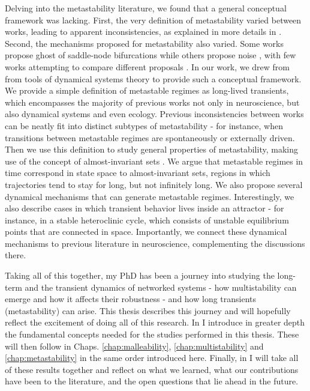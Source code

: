 Delving into the metastability literature, we found that a general conceptual framework was lacking. First, the very definition of metastability varied between works, leading to apparent inconsistencies, as explained in more details in . Second, the mechanisms proposed for metastability also varied. Some works propose ghost of saddle-node bifurcations \cite{tognoli2014metastable} while others propose noise \cite{brinkman2022metastable}, with few works attempting to compare different proposals \cite{graben2019metastable}. In our work, we drew from from tools of dynamical systems theory to provide such a conceptual framework. We provide a simple definition of metastable regimes as long-lived transients, which encompasses the majority of previous works not only in neuroscience, but also dynamical systems and even ecology. Previous inconsistencies between works can be neatly fit into distinct subtypes of metastability - for instance, when transitions between metastable regimes are spontaneously or externally driven.
Then we use this definition to study general properties of metastability, making use of the concept of almost-invariant sets \cite{dellnitz2003congestion, froyland2005statistically}. We argue that metastable regimes in time correspond in state space to almost-invariant sets, regions in which trajectories tend to stay for long, but not infinitely long. We also propose several dynamical mechanisms that can generate metastable regimes. Interestingly, we also describe cases in which transient behavior lives inside an attractor - for instance, in a stable heteroclinic cycle, which consists of unstable equilibrium points that are connected in space. Importantly, we connect these dynamical mechanisms to previous literature in neuroscience, complementing the discussions there.   

Taking all of this together, my PhD has been a journey into studying the long-term and the transient dynamics of networked systems - how multistability can emerge and how it affects their robustness - and how long transients (metastability) can arise.  This thesis describes this journey and will hopefully reflect the excitement of doing all of this research. In  I introduce in greater depth the fundamental concepts needed for the studies performed in this thesis. These will then follow in Chaps. \ref{chap:malleability}, \ref{chap:multistability} and \ref{chap:metastability} in the same order introduced here. Finally, in  I will take all of these results together and reflect on what we learned, what our contributions have been to the literature, and the open questions that lie ahead in the future. 

